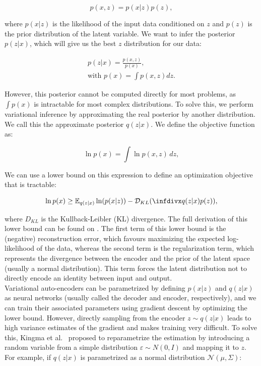 \begin{equation}
    p(x,z) = p(x|z)p(z),
\end{equation}

where $p(x|z)$ is the likelihood of the input data conditioned on $z$ and $p(z)$ is the prior distribution of the latent variable. We want to infer the posterior $p(z|x)$, which will give us the best $z$ distribution for our data:

\begin{equation} \label{eq:rnnvae:intract}
\begin{gathered}
p(z|x) = \frac{p(x,z)}{p(x)}, \\
\text{with } p(x) = \int p(x,z) dz.
\end{gathered}
\end{equation}

However, this posterior cannot be computed directly for most problems, as $\int p(x)$ is intractable for most complex distributions. To solve this, we perform variational inference by approximating the real posterior by another distribution. We call this the approximate posterior $q(z|x)$. We define the objective function as:

\begin{equation}
\ln p(x) = \int \ln p(x,z) \,dz,
\end{equation}

We can use a lower bound on this expression to define an optimization objective that is tractable: 

\begin{equation}
    \ln p(x) \geq \mathbb{E}_{q(z|x)} \ln(p(x|z)) - \mathcal{D}_{KL}(\infdiv{q(z|x)}{p(z)}),
\end{equation}

where $D_{KL}$ is the Kullback-Leibler (KL) divergence. The full derivation of this lower bound can be found on \cite{Kingma2014}. The first term of this lower bound is the (negative) reconstruction error, which favours maximizing the expected log-likelihood of the data, whereas the second term is the regularization term, which represents the divergence between the encoder and the prior of the latent space (usually a normal distribution). This term forces the latent distribution not to directly encode an identity between input and output. \\

Variational auto-encoders can be parametrized by defining $p(x|z)$ and $q(z|x)$ as neural networks (usually called the decoder and encoder, respectively), and we can train their associated parameters using gradient descent by optimizing the lower bound. However, directly sampling from the encoder $z\sim q(z|x)$ leads to high variance estimates of the gradient and makes training very difficult. To solve this, Kingma et al.\ \cite{Kingma2015} proposed to reparametrize the estimation by introducing a random variable from a simple distribution $\varepsilon \sim N(0,I)$ and mapping it to $z$. For example, if $q(z|x)$ is parametrized as a normal distribution $\mathcal{N}(\mu, \Sigma)$:

